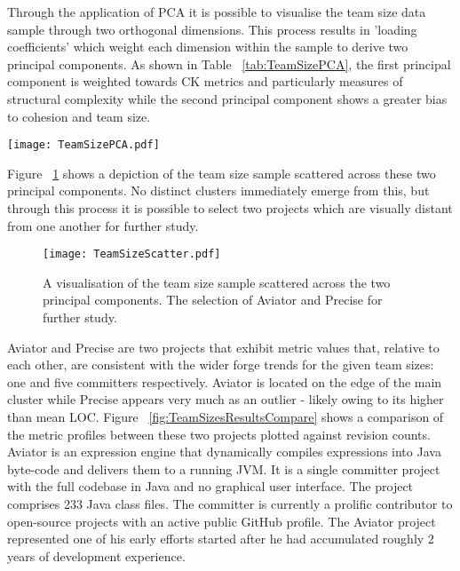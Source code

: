 Through the application of PCA it is possible to visualise the team size data sample through two orthogonal dimensions. This process results in 'loading coefficients' which weight each dimension within the sample to derive two principal components. As shown in Table ~\ref{tab:TeamSizePCA}, the first principal component is weighted towards CK metrics and particularly measures of structural complexity while the second principal component shows a greater bias to cohesion and team size.

\begin{table}
\begin{tabular}
 \centering 
 \texttt{[image: TeamSizePCA.pdf]}
 \label{tab:TeamSizePCA}
\end{tabular}
\end{table}

Figure ~\ref{fig:TeamSizeScatter} shows a depiction of the team size sample scattered across these two principal components. No distinct clusters immediately emerge from this, but through this process it is possible to select two projects which are visually distant from one another for further study.

\begin{figure}[htbp!] 
\centering    
\texttt{[image: TeamSizeScatter.pdf]}
\caption{A visualisation of the team size sample scattered across the two principal components. The selection of Aviator and Precise for further study.}
\label{fig:TeamSizeScatter}
\end{figure}

Aviator and Precise are two projects that exhibit metric values that, relative to each other, are consistent with the wider forge trends for the given team sizes: one and five committers respectively. Aviator is located on the edge of the main cluster while Precise appears very much as an outlier - likely owing to its higher than mean LOC. Figure ~\ref{fig:TeamSizesResultsCompare} shows a comparison of the metric profiles between these two projects plotted against revision counts. Aviator is an expression engine that dynamically compiles expressions into Java byte-code and delivers them to a running JVM. It is a single committer project with the full codebase in Java and no graphical user interface. The project comprises 233 Java class files. The committer is currently a prolific contributor to open-source projects with an active public GitHub profile. The Aviator project represented one of his early efforts started after he had accumulated roughly 2 years of development experience. 

